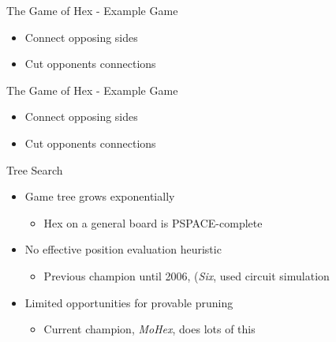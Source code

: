 \documentclass{beamer}
\begin{document}
\begin{frame}{The Game of Hex - Example Game}
	\begin{figure}[tb]
	\end{figure}
	\begin{itemize}
		\item Connect opposing sides
		\item Cut opponents connections
	\end{itemize}
\end{frame}

\begin{frame}{The Game of Hex - Example Game}
	\begin{figure}[tb]
	\end{figure}
	\begin{itemize}
		\item Connect opposing sides
		\item Cut opponents connections
	\end{itemize}
\end{frame}

\begin{frame}{Tree Search}
\begin{itemize}
	\item Game tree grows exponentially
	\begin{itemize}
		\item Hex on a general board is PSPACE-complete
	\end{itemize}
	\item No effective position evaluation heuristic
	\begin{itemize}
		\item Previous champion until 2006, (\emph{Six}, used circuit simulation
	\end{itemize}
	\item Limited opportunities for provable pruning
	\begin{itemize}
		\item Current champion, \emph{MoHex}, does lots of this
	\end{itemize}
\end{itemize}
\end{frame}
\end{document}

